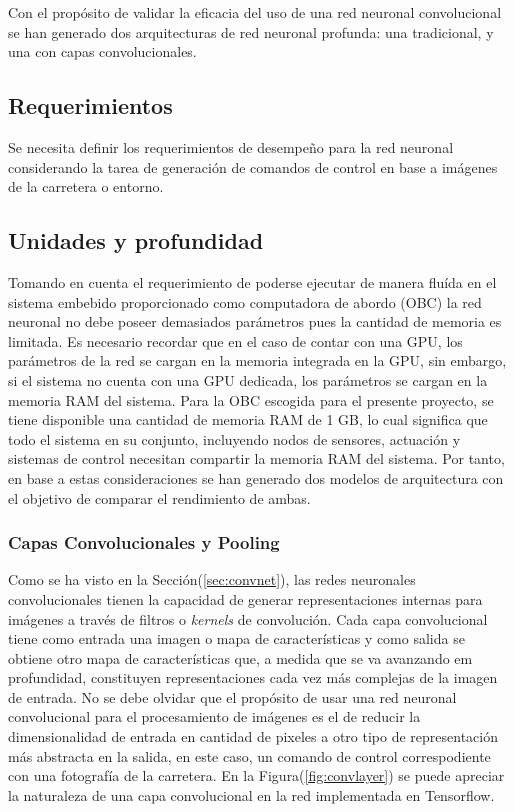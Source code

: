 Con el propósito de validar la eficacia del uso de una red neuronal convolucional se han generado dos arquitecturas de 
red neuronal profunda: una tradicional, y una con capas convolucionales.

    \subsection{Requerimientos}
    Se necesita definir los requerimientos de desempeño para la red neuronal considerando la tarea de generación de comandos 
    de control en base a imágenes de la carretera o entorno.
    
    \subsection{Unidades y profundidad}

    Tomando en cuenta el requerimiento de poderse ejecutar de manera fluída en el sistema embebido proporcionado como computadora 
    de abordo (OBC) la red neuronal no debe poseer demasiados parámetros pues la cantidad de memoria es limitada. Es necesario 
    recordar que en el caso de contar con una GPU, los parámetros de la red se cargan en la memoria integrada en la GPU, sin 
    embargo, si el sistema no cuenta con una GPU dedicada, los parámetros se cargan en la memoria RAM del sistema. Para 
    la OBC escogida para el presente proyecto, se tiene disponible una cantidad de memoria RAM de 1 GB, lo cual significa 
    que todo el sistema en su conjunto, incluyendo nodos de sensores, actuación y sistemas de control necesitan compartir la 
    memoria RAM del sistema. Por tanto, en base a estas consideraciones se han generado dos modelos de arquitectura con el 
    objetivo de comparar el rendimiento de ambas.


        \subsubsection{Capas Convolucionales y Pooling}
        Como se ha visto en la Sección(\ref{sec:convnet}), las redes neuronales convolucionales tienen la capacidad de generar representaciones 
        internas para imágenes a través de filtros o \textit{kernels} de convolución. Cada capa convolucional tiene como entrada 
        una imagen o mapa de características y como salida se obtiene otro mapa de características que, a medida que se va 
        avanzando em profundidad, constituyen representaciones cada vez más complejas de la imagen de entrada. No se debe olvidar 
        que el propósito de usar una red neuronal convolucional para el procesamiento de imágenes es el de reducir la dimensionalidad 
        de entrada en cantidad de pixeles a otro tipo de representación más abstracta en la salida, en este caso, un comando de control 
        correspodiente con una fotografía de la carretera. En la Figura(\ref{fig:convlayer}) se puede apreciar la naturaleza 
        de una capa convolucional en la red implementada en Tensorflow.

